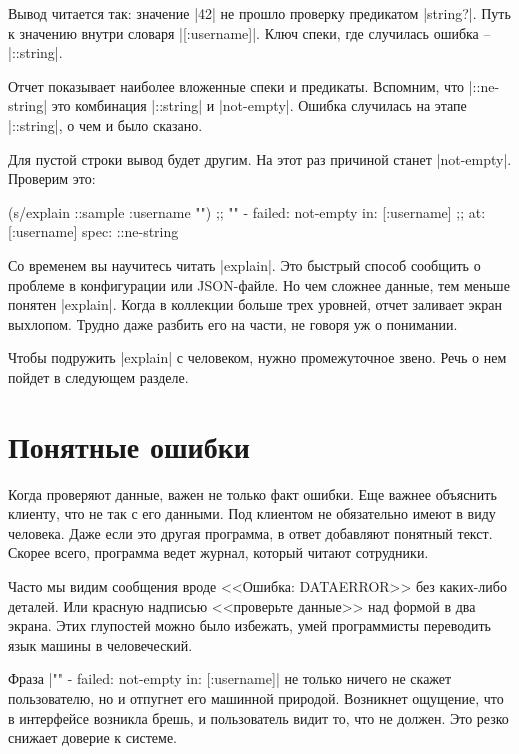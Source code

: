 Вывод читается так: значение \spverb|42| не прошло проверку предикатом
\spverb|string?|. Путь к значению внутри словаря \spverb|[:username]|. Ключ
спеки, где случилась ошибка -- \spverb|::string|.

Отчет показывает наиболее вложенные спеки и предикаты. Вспомним, что
\spverb|::ne-string| это комбинация \spverb|::string| и
\spverb|not-empty|. Ошибка случилась на этапе \spverb|::string|, о чем и было
сказано.

Для пустой строки вывод будет другим. На этот раз причиной станет
\spverb|not-empty|. Проверим это:

\begin{english}
  \begin{clojure}
(s/explain ::sample {:username ""})
;; "" - failed: not-empty in: [:username]
;; at: [:username] spec: ::ne-string
  \end{clojure}
\end{english}

Со временем вы научитесь читать \spverb|explain|. Это быстрый способ сообщить о
проблеме в конфигурации или JSON-файле. Но чем сложнее данные, тем меньше
понятен \spverb|explain|. Когда в коллекции больше трех уровней, отчет заливает
экран выхлопом. Трудно даже разбить его на части, не говоря уж о понимании.

Чтобы подружить \spverb|explain| с человеком, нужно промежуточное звено. Речь о
нем пойдет в следующем разделе.

\section{Понятные ошибки}

\label{spec-messages}

Когда проверяют данные, важен не только факт ошибки. Еще важнее объяснить
клиенту, что не так с его данными. Под клиентом не обязательно имеют в виду
человека. Даже если это другая программа, в ответ добавляют понятный
текст. Скорее всего, программа ведет журнал, который читают сотрудники.

Часто мы видим сообщения вроде <<Ошибка: DATAERROR>> без каких-либо деталей. Или
красную надписью <<проверьте данные>> над формой в два экрана. Этих глупостей
можно было избежать, умей программисты переводить язык машины в человеческий.

Фраза \spverb|"" - failed: not-empty in: [:username]| не только ничего не скажет
пользователю, но и отпугнет его машинной природой. Возникнет ощущение, что в
интерфейсе возникла брешь, и пользователь видит то, что не должен. Это резко
снижает доверие к системе.

